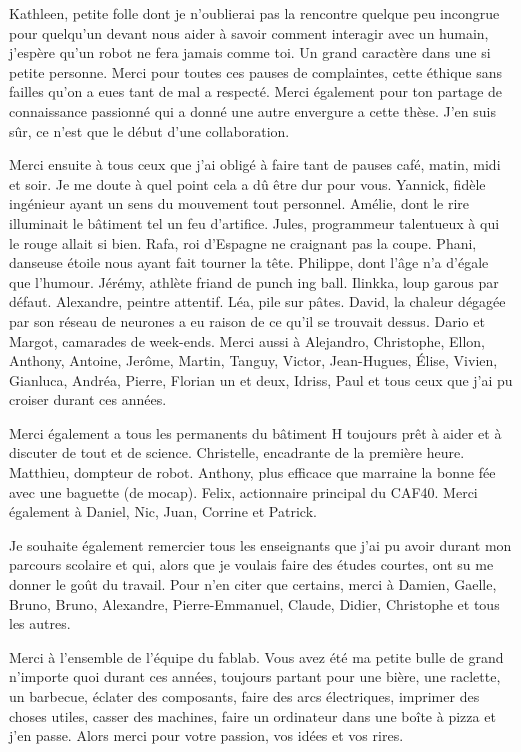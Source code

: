\documentclass[english,a4paper,11pt,twoside]{StyleThese}
\begin{document}
Kathleen, petite folle dont je n'oublierai pas la rencontre quelque peu incongrue pour quelqu'un devant nous aider à savoir comment interagir avec un humain, j'espère qu'un robot ne fera jamais comme toi. Un grand caractère dans une si petite personne. Merci pour toutes ces pauses de complaintes, cette éthique sans failles qu'on a eues tant de mal a respecté. Merci également pour ton partage de connaissance passionné qui a donné une autre envergure a cette thèse. J'en suis sûr, ce n'est que le début d'une collaboration.

Merci ensuite à tous ceux que j'ai obligé à faire tant de pauses café, matin, midi et soir. Je me doute à quel point cela a dû être dur pour vous. Yannick, fidèle ingénieur ayant un sens du mouvement tout personnel. Amélie, dont le rire illuminait le bâtiment tel un feu d'artifice. Jules, programmeur talentueux à qui le rouge allait si bien. Rafa, roi d'Espagne ne craignant pas la coupe. Phani, danseuse étoile nous ayant fait tourner la tête. Philippe, dont l'âge n'a d'égale que l'humour. Jérémy, athlète friand de punch ing ball. Ilinkka, loup garous par défaut. Alexandre, peintre attentif. Léa, pile sur pâtes. David, la chaleur dégagée par son réseau de neurones a eu raison de ce qu'il se trouvait dessus. Dario et Margot, camarades de week-ends. Merci aussi à Alejandro, Christophe, Ellon, Anthony, Antoine, Jerôme, Martin, Tanguy, Victor, Jean-Hugues, Élise, Vivien, Gianluca, Andréa, Pierre, Florian un et deux, Idriss, Paul et tous ceux que j'ai pu croiser durant ces années.

Merci également a tous les permanents du bâtiment H toujours prêt à aider et à discuter de tout et de science. Christelle, encadrante de la première heure. Matthieu, dompteur de robot. Anthony, plus efficace que marraine la bonne fée avec une baguette (de mocap). Felix, actionnaire principal du CAF40. Merci également à Daniel, Nic, Juan, Corrine et Patrick.

Je souhaite également remercier tous les enseignants que j'ai pu avoir durant mon parcours scolaire et qui, alors que je voulais faire des études courtes, ont su me donner le goût du travail. Pour n'en citer que certains, merci à Damien, Gaelle, Bruno, Bruno, Alexandre, Pierre-Emmanuel, Claude, Didier, Christophe et tous les autres.

Merci à l'ensemble de l'équipe du fablab. Vous avez été ma petite bulle de grand n'importe quoi durant ces années, toujours partant pour une bière, une raclette, un barbecue, éclater des composants, faire des arcs électriques, imprimer des choses utiles, casser des machines, faire un ordinateur dans une boîte à pizza et j'en passe. Alors merci pour votre passion, vos idées et vos rires.
\end{document}
